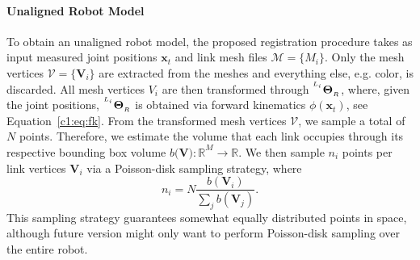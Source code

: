 \paragraph{Unaligned Robot Model}
\label{c1:sec:unaligned_robot_model}
To obtain an unaligned robot model, the proposed registration procedure takes as input measured joint positions $\mathbf{x}_t$ and link mesh files $\mathcal{M} = \{M_i\}$. Only the mesh vertices $\mathcal{V} = \{\mathbf{V}_i\}$ are extracted from the meshes and everything else, e.g. color, is discarded. All mesh vertices $V_i$ are then transformed through ${}^{^{L_i}}\mathbf{\Theta}_{_R}$, where, given the joint positions, ${}^{^{L_i}}\mathbf{\Theta}_{_R}$ is obtained via forward kinematics $\phi(\mathbf{x}_t)$, see Equation~\ref{c1:eq:fk}. From the transformed mesh vertices $\mathcal{V}$, we sample a total of $N$ points. Therefore, we estimate the volume that each link occupies through its respective bounding box volume $b(\mathbf{{V}):\mathbb{R}}^M \rightarrow \mathbb{R}$. We then sample $n_i$ points per link vertices $\mathbf{V}_i$ via a Poisson-disk sampling strategy, where
\begin{equation}
    n_i = N\frac{b(\mathbf{V}_i)}{\sum_j b(\mathbf{V}_j)}.
\end{equation}
This sampling strategy guarantees somewhat equally distributed points in space, although future version might only want to perform Poisson-disk sampling over the entire robot.


